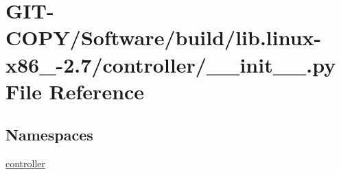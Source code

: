 \hypertarget{GIT-COPY_2Software_2build_2lib_8linux-x86__64-2_87_2controller_2____init_____8py}{}\section{G\+I\+T-\/\+C\+O\+P\+Y/\+Software/build/lib.linux-\/x86\+\_-\/2.7/controller/\+\_\+\+\_\+init\+\_\+\+\_\+.py File Reference}
\label{GIT-COPY_2Software_2build_2lib_8linux-x86__64-2_87_2controller_2____init_____8py}
\subsection*{Namespaces}
\begin{DoxyCompactItemize}
\item 
 \hyperlink{namespacecontroller}{controller}
\end{DoxyCompactItemize}
